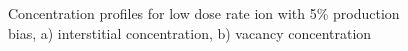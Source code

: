 \documentclass[a4paper]{article}
\begin{document}
\begin{figure}[h!]
        \caption{Concentration profiles for low dose rate ion with 5\% production bias, a) interstitial concentration, b) vacancy concentration}
        \label{figure:concentrations_ion_5_1e-6}
      \end{figure}
\end{document}
